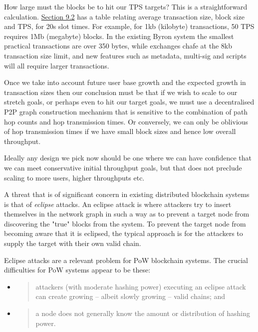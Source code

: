 \documentclass[]{article}
\begin{document}
How large must the blocks be to hit our TPS targets? This is a
straightforward calculation.
\protect\hyperlink{fundamental-tradeoffs}{{Section 9.2}} has a table
relating average transaction size, block size and TPS, for 20s slot
times. For example, for 1kb (kilobyte) transactions, 50 TPS requires 1Mb
(megabyte) blocks. In the existing Byron system the smallest practical
transactions are over 350 bytes, while exchanges chafe at the 8kb
transaction size limit, and new features such as metadata, multi-sig and
scripts will all require larger transactions.

Once we take into account future user base growth and the expected
growth in transaction sizes then our conclusion must be that if we wish
to scale to our stretch goals, or perhaps even to hit our target goals,
we must use a decentralised P2P graph construction mechanism that is
sensitive to the combination of path hop counts and hop transmission
times. Or conversely, we can only be oblivious of hop transmission times
if we have small block sizes and hence low overall throughput.

Ideally any design we pick now should be one where we can have
confidence that we can meet conservative initial throughput goals, but
that does not preclude scaling to more users, higher throughputs etc.

A threat that is of significant concern in existing distributed
blockchain systems is that of \emph{eclipse} attacks. An eclipse attack
is where attackers try to insert themselves in the network graph in such
a way as to prevent a target node from discovering the "true" blocks
from the system. To prevent the target node from becoming aware that it
is eclipsed, the typical approach is for the attackers to supply the
target with their own valid chain.

Eclipse attacks are a relevant problem for PoW blockchain systems. The
crucial difficulties for PoW systems appear to be these:

\begin{itemize}
\item
  \begin{quote}
  attackers (with moderate hashing power) executing an eclipse attack
  can create growing -- albeit slowly growing -- valid chains; and
  \end{quote}
\item
  \begin{quote}
  a node does not generally know the amount or distribution of hashing
  power.
  \end{quote}
\end{itemize}
\end{document}
